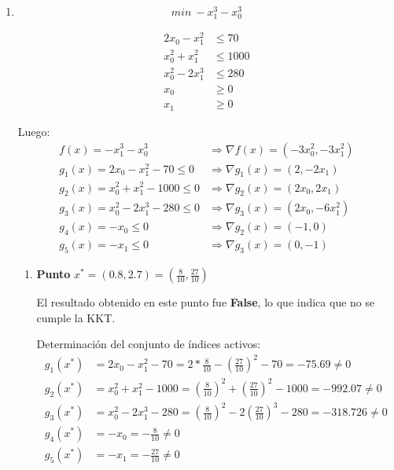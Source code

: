 \documentclass[titlepage, 11pt]{scrartcl}
\begin{document}
\begin{enumerate}
\begin{enumerate}
\begin{enumerate}
			En este caso $I(x^*)  = \emptyset$, por tanto se cumple la condici\'on de regularidad de $x^*$, o sea, que cumple con la LICQ.
			
			El hecho de que no se cumpla la condición de KKT permite afirmar que o bien el punto no es un m\'inimo local del problema o que no se cumple la LICQ (que no se cumplan ninguna de las dos también podría es una opci\'on); en este caso, s\'i se cumple la condici\'on de regularidad, por tanto el punto $x^*$ no es un m\'inimo local del problema.
		\end{enumerate}
	
		\vspace{1cm}
	\item \begin{equation*}
	min \ -x_1^3 - x_0^3
	\end{equation*}
	
	\begin{align*}
	2x_0 - x_1^2 &\leq 70\\
	x_0^2 + x_1^2 &\leq 1000\\
	x_0^2 - 2 x_1^3 &\leq 280\\
	x_0 &\geq 0\\
	x_1 &\geq 0
	\end{align*}
	
	Luego:
	\begin{align*}
	f(x) = -x_1^3 - x_0^3 &\Rightarrow \nabla f(x) = (-3x_0^2, -3x_1^2)\\
	g_1(x) = 2x_0 - x_1^2 - 70\leq 0 &\Rightarrow \nabla g_1(x) = (2, -2x_1)\\
	g_2(x) = x_0^2 + x_1^2- 1000 \leq 0 &\Rightarrow \nabla g_2(x) = (2x_0, 2x_1)\\
	g_3(x) = x_0^2 - 2 x_1^3 - 280 \leq 0 &\Rightarrow \nabla g_3(x) = (2x_0, -6x_1^2) \\
	g_4(x) = -x_0 \leq 0 &\Rightarrow \nabla g_2(x) = (-1, 0)\\
	g_5(x) =  -x_1 \leq 0 &\Rightarrow \nabla g_3(x) = (0, -1)
	\end{align*}
	
		\begin{enumerate}
			\item \textbf{Punto} $x^* = (0.8, 2.7) = (\frac{8}{10}, \frac{27}{10})$
			
			El resultado obtenido en este punto fue \textbf{False}, lo que indica que no se cumple la KKT.
			
			Determinaci\'on del conjunto de \'indices activos:
			\begin{align*}
			g_1(x^*) &= 2x_0 - x_1^2 - 70 = 2 * \frac{8}{10} - (\frac{27}{10})^2 - 70 = -75.69\neq 0\\
			g_2(x^*) &= x_0^2 + x_1^2- 1000 = (\frac{8}{10})^2 + (\frac{27}{10})^2 - 1000 = -992.07 \neq 0\\
			g_3(x^*) &= x_0^2 - 2 x_1^3 - 280 = (\frac{8}{10})^2 - 2 (\frac{27}{10})^3 - 280 = -318.726 \neq 0\\
			g_4(x^*) &= -x_0 = -\frac{8}{10} \neq 0\\
			g_5(x^*) &= -x_1 = -\frac{27}{10} \neq 0
			\end{align*}
			

\end{enumerate}
\end{enumerate}
\end{enumerate}
\end{document}
